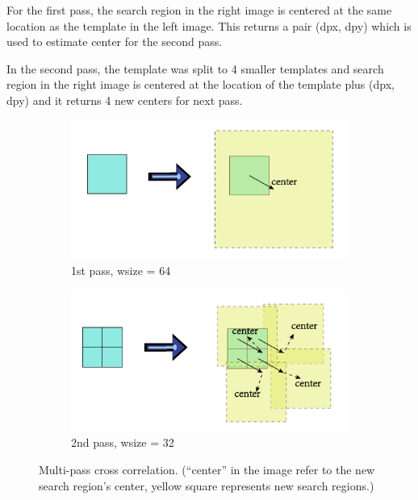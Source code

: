 For the first pass, the search region in the right image is centered at the same location as the template in the left image. This returns a pair (dpx, dpy) which is used to estimate center for the second pass.

In the second pass, the template was split to 4 smaller templates and search region in the right image is centered at the location of the template plus (dpx, dpy) and it returns 4 new centers for next pass.

\begin{figure}[h!]
	\centering
	\begin{subfigure}[t]{0.48\linewidth}
		\centering
		\includegraphics[width=1\linewidth]{figures/part2/multi_pass1}
		\caption{1st pass, wsize = 64}
	\end{subfigure}
	\begin{subfigure}[t]{0.48\linewidth}
		\centering
		\includegraphics[width=1\linewidth]{figures/part2/multi_pass2}
		\caption{2nd pass, wsize = 32}
	\end{subfigure}
	\caption{Multi-pass cross correlation. (``center'' in the image refer to the new search region's center, yellow square represents new search regions.)}
	\label{fig:multi_pass}
\end{figure}

